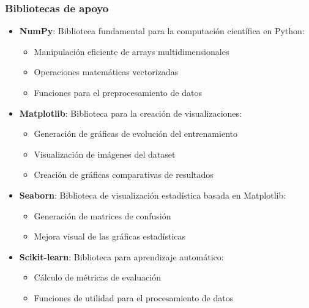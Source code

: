 \documentclass[11pt,a4paper]{article}
\begin{document}
\subsubsection{Bibliotecas de apoyo}
\begin{itemize}
    \item \textbf{NumPy}: Biblioteca fundamental para la computación científica en Python:
    \begin{itemize}
        \item Manipulación eficiente de arrays multidimensionales
        \item Operaciones matemáticas vectorizadas
        \item Funciones para el preprocesamiento de datos
    \end{itemize}
    
    \item \textbf{Matplotlib}: Biblioteca para la creación de visualizaciones:
    \begin{itemize}
        \item Generación de gráficas de evolución del entrenamiento
        \item Visualización de imágenes del dataset
        \item Creación de gráficas comparativas de resultados
    \end{itemize}
    
    \item \textbf{Seaborn}: Biblioteca de visualización estadística basada en Matplotlib:
    \begin{itemize}
        \item Generación de matrices de confusión
        \item Mejora visual de las gráficas estadísticas
    \end{itemize}
    
    \item \textbf{Scikit-learn}: Biblioteca para aprendizaje automático:
    \begin{itemize}
        \item Cálculo de métricas de evaluación
        \item Funciones de utilidad para el procesamiento de datos
    \end{itemize}
\end{itemize}
\end{document}
